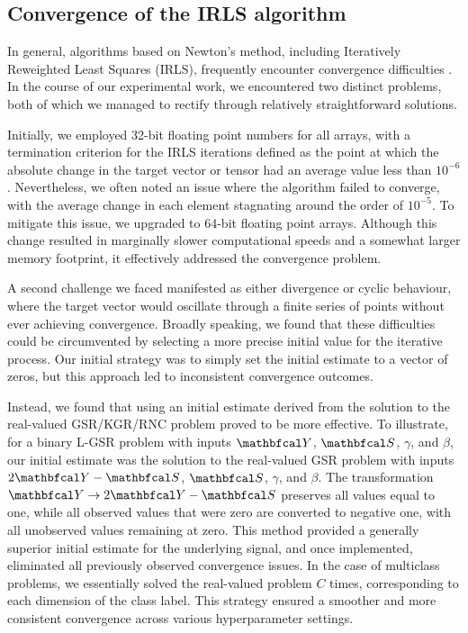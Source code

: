 \subsection{Convergence of the IRLS algorithm}

In general, algorithms based on Newton's method, including Iteratively Reweighted Least Squares (IRLS), frequently encounter convergence difficulties \citep{Kelley2003}. In the course of our experimental work, we encountered two distinct problems, both of which we managed to rectify through relatively straightforward solutions.

Initially, we employed 32-bit floating point numbers for all arrays, with a termination criterion for the IRLS iterations defined as the point at which the absolute change in the target vector or tensor had an average value less than $10^{-6}$. Nevertheless, we often noted an issue where the algorithm failed to converge, with the average change in each element stagnating around the order of $10^{-5}$. To mitigate this issue, we upgraded to 64-bit floating point arrays. Although this change resulted in marginally slower computational speeds and a somewhat larger memory footprint, it effectively addressed the convergence problem.

A second challenge we faced manifested as either divergence or cyclic behaviour, where the target vector would oscillate through a finite series of points without ever achieving convergence. Broadly speaking, we found that these difficulties could be circumvented by selecting a more precise initial value for the iterative process. Our initial strategy was to simply set the initial estimate to a vector of zeros, but this approach led to inconsistent convergence outcomes.

Instead, we found that using an initial estimate derived from the solution to the real-valued GSR/KGR/RNC problem proved to be more effective. To illustrate, for a binary L-GSR problem with inputs $\Yt$, $\St$, $\gamma$, and $\beta$, our initial estimate was the solution to the real-valued GSR problem with inputs $2 \Yt - \St$, $\St$, $\gamma$, and $\beta$. The transformation $\Yt \rightarrow 2 \Yt - \St$ preserves all values equal to one, while all observed values that were zero are converted to negative one, with all unobserved values remaining at zero. This method provided a generally superior initial estimate for the underlying signal, and once implemented, eliminated all previously observed convergence issues. In the case of multiclass problems, we essentially solved the real-valued problem $C$ times, corresponding to each dimension of the class label. This strategy ensured a smoother and more consistent convergence across various hyperparameter settings. 



